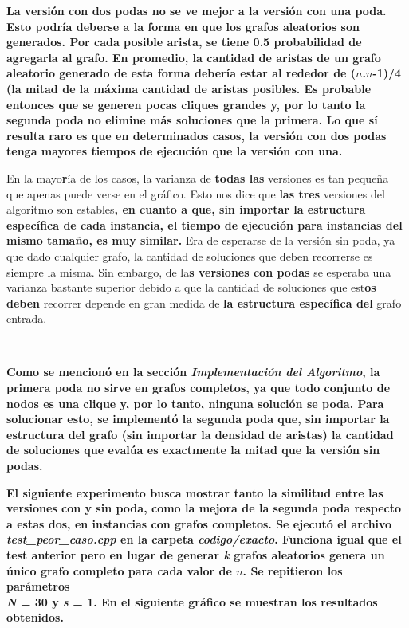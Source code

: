{\par{{\color{black}\textbf{La versión con dos podas no se ve mejor a la versión
con una poda. Esto podría deberse a la forma en que los grafos aleatorios
son generados. Por cada posible arista, se tiene 0.5 probabilidad de
agregarla al grafo. En promedio, la cantidad de aristas de un grafo
aleatorio generado de esta forma debería estar al rededor de ($n$.$n$-1)/4 (la
mitad de la máxima cantidad de aristas posibles. Es probable entonces que
se generen pocas cliques grandes y, por lo tanto la segunda poda no elimine
más soluciones que la primera. Lo que sí resulta raro es que en determinados
casos, la versión con dos podas tenga mayores tiempos de ejecución que la
versión con una.}}}\\

\par{En la mayo{\color{black}\textbf{r}}ía de los casos, la varianza de
{\color{black}\textbf{todas las}} versiones es tan pequeña
que apenas puede verse en el gráfico. Esto nos dice que
{\color{black}\textbf{las tres}} versiones del
algoritmo son estables{\color{black}\textbf{, en cuanto a que, sin importar la
estructura específica de cada instancia, el tiempo de ejecución para instancias
del mismo tamaño, es muy similar.}} Era de esperarse de la versión sin poda, ya
que dado cualquier grafo, la cantidad de soluciones que deben recorrerse es
siempre la misma. Sin embargo, de la{\color{black}\textbf{s versiones con
podas}} se esperaba una varianza bastante
superior debido a que la cantidad de soluciones que est{\color{black}\textbf{os
deben}} recorrer depende
en gran medida de {\color{black}\textbf{la estructura específica del}} grafo
entrada.}}\\

\par{\textbf{Como se mencionó en la sección \textit{Implementación del
Algoritmo}, la primera poda no sirve en grafos completos, ya que todo
conjunto de nodos es una clique y, por lo tanto, ninguna solución se poda.
Para solucionar esto, se implementó la segunda poda que, sin importar la
estructura del grafo (sin importar la densidad de aristas) la cantidad de
soluciones que evalúa es exactmente la mitad que la versión sin podas.}}\\

\par{\textbf{El siguiente experimento busca mostrar tanto la
similitud entre las versiones con y sin poda, como la mejora de la segunda
poda respecto a estas dos, en instancias con grafos completos. Se ejecutó
el archivo \textit{test\_peor\_caso.cpp} en la carpeta \textit{codigo/exacto}.
Funciona igual que el test anterior pero en lugar de generar \textit{k}
grafos aleatorios genera un único grafo completo para cada valor de $n$. Se
repitieron los parámetros \\\textit{N} = 30 y \textit{s} = 1. En el siguiente
gráfico se muestran los resultados obtenidos.}}

